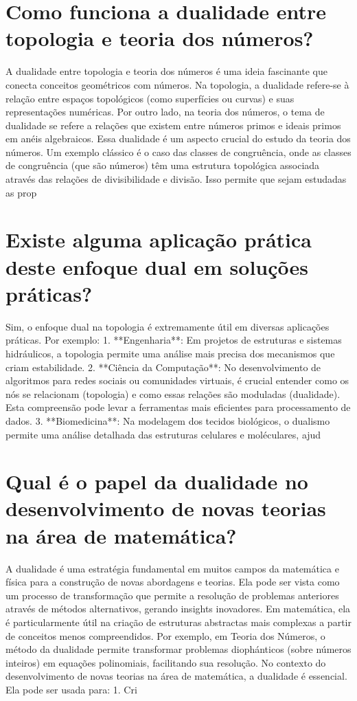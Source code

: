 \documentclass[11pt,a4paper]{article}
\begin{document}
\section{Como funciona a dualidade entre topologia e teoria dos números?}
A dualidade entre topologia e teoria dos números é uma ideia fascinante que conecta conceitos geométricos com números. Na topologia, a dualidade refere-se à relação entre espaços topológicos (como superfícies ou curvas) e suas representações numéricas. Por outro lado, na teoria dos números, o tema de dualidade se refere a relações que existem entre números primos e ideais primos em anéis algebraicos. Essa dualidade é um aspecto crucial do estudo da teoria dos números. Um exemplo clássico é o caso das classes de congruência, onde as classes de congruência (que são números) têm uma estrutura topológica associada através das relações de divisibilidade e divisão. Isso permite que sejam estudadas as prop

\section{Existe alguma aplicação prática deste enfoque dual em soluções práticas?}
Sim, o enfoque dual na topologia é extremamente útil em diversas aplicações práticas. Por exemplo: 1. **Engenharia**: Em projetos de estruturas e sistemas hidráulicos, a topologia permite uma análise mais precisa dos mecanismos que criam estabilidade. 2. **Ciência da Computação**: No desenvolvimento de algoritmos para redes sociais ou comunidades virtuais, é crucial entender como os nós se relacionam (topologia) e como essas relações são moduladas (dualidade). Esta compreensão pode levar a ferramentas mais eficientes para processamento de dados. 3. **Biomedicina**: Na modelagem dos tecidos biológicos, o dualismo permite uma análise detalhada das estruturas celulares e moléculares, ajud

\section{Qual é o papel da dualidade no desenvolvimento de novas teorias na área de matemática?}
A dualidade é uma estratégia fundamental em muitos campos da matemática e física para a construção de novas abordagens e teorias. Ela pode ser vista como um processo de transformação que permite a resolução de problemas anteriores através de métodos alternativos, gerando insights inovadores. Em matemática, ela é particularmente útil na criação de estruturas abstractas mais complexas a partir de conceitos menos compreendidos. Por exemplo, em Teoria dos Números, o método da dualidade permite transformar problemas diophánticos (sobre números inteiros) em equações polinomiais, facilitando sua resolução. No contexto do desenvolvimento de novas teorias na área de matemática, a dualidade é essencial. Ela pode ser usada para: 1. Cri
\end{document}
